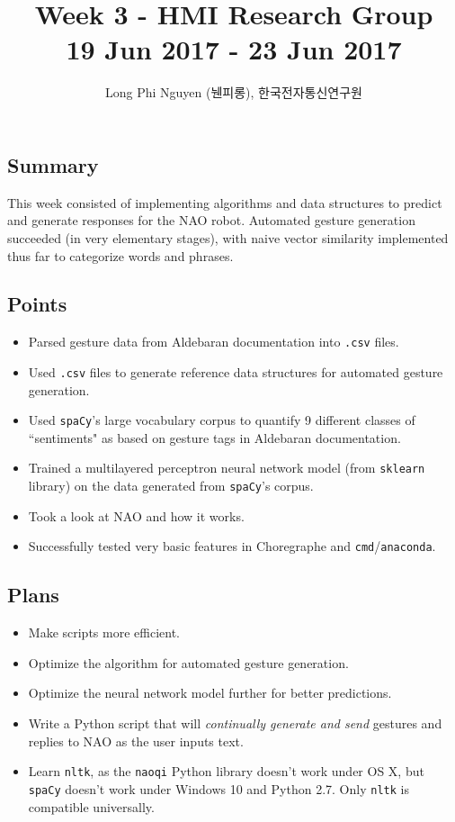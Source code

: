 \documentclass{article}
\title{Week 3 - HMI Research Group \\ \large 19 Jun 2017 - 23 Jun 2017}
\author{Long Phi Nguyen (뉀피롱), 한국전자통신연구원}
\begin{document}
  \maketitle


  \subsection*{Summary} This week consisted of implementing algorithms and data structures to predict and generate responses for the NAO robot. Automated gesture generation succeeded (in very elementary stages), with naive vector similarity implemented thus far to categorize words and phrases.

  \subsection*{Points}
  \begin{itemize}
    \item Parsed gesture data from Aldebaran documentation into \verb|.csv| files.
    \item Used \verb|.csv| files to generate reference data structures for automated gesture generation.
    \item Used \verb|spaCy|'s large vocabulary corpus to quantify 9 different classes of ``sentiments" as based on gesture tags in Aldebaran documentation.
    \item Trained a multilayered perceptron neural network model (from \verb|sklearn| library) on the data generated from \verb|spaCy|'s corpus.
    \item Took a look at NAO and how it works.
    \item Successfully tested very basic features in Choregraphe and \verb|cmd|/\verb|anaconda|.
  \end{itemize}

  \subsection*{Plans}
  \begin{itemize}
    \item Make scripts more efficient.
    \item Optimize the algorithm for automated gesture generation.
    \item Optimize the neural network model further for better predictions.
    \item Write a Python script that will \emph{continually generate and send} gestures and replies to NAO as the user inputs text.
    \item Learn \verb|nltk|, as the \verb|naoqi| Python library doesn't work under OS X, but \verb|spaCy| doesn't work under Windows 10 and Python 2.7. Only \verb|nltk| is compatible universally.
  \end{itemize}
\end{document}
